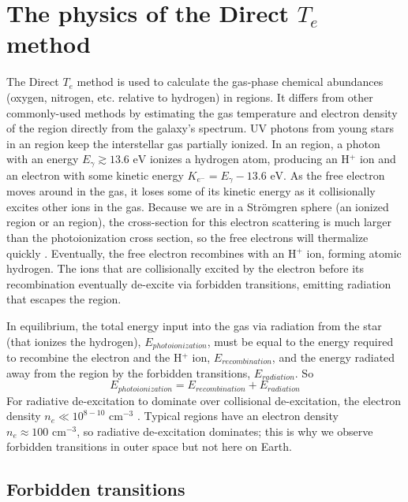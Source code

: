 \chapter[Direct method physics]{The physics of the Direct $T_e$ method}\label{sec:physics}

The Direct $T_e$ method is used to calculate the gas-phase chemical abundances 
(oxygen, nitrogen, etc. relative to hydrogen) in  regions.  It differs 
from other commonly-used methods by estimating the gas temperature and electron 
density of the region directly from the galaxy's spectrum.  UV photons from 
young stars in an  region keep the interstellar gas partially ionized.  
In an  region, a photon with an energy 
$E_\gamma \gtrsim 13.6\text{ eV}$ ionizes a hydrogen atom, producing an H$^+$ 
ion and an electron with some kinetic energy 
$K_{e^-} = E_\gamma - 13.6\text{ eV}$.  As the free electron moves around in the 
gas, it loses some of its kinetic energy as it collisionally excites other ions 
in the gas.  Because we are in a Str\"{o}mgren sphere (an ionized region or an 
 region), the cross-section for this electron scattering is much 
larger than the photoionization cross section, so the free electrons will 
thermalize quickly \citep{DeRobertis87}.  Eventually, the free electron 
recombines with an H$^+$ ion, forming atomic hydrogen.  The ions that are 
collisionally excited by the electron before its recombination eventually 
de-excite via forbidden transitions, emitting radiation that escapes the 
 region.

In equilibrium, the total energy input into the gas via radiation from the star 
(that ionizes the hydrogen), $E_{photoionization}$, must be equal to the energy 
required to recombine the electron and the H$^+$ ion, $E_{recombination}$, and 
the energy radiated away from the  region by the forbidden 
transitions, $E_{radiation}$.  So
\begin{equation}
    E_{photoionization} = E_{recombination} + E_{radiation}
\end{equation}
For radiative de-excitation to dominate over collisional de-excitation, the 
electron density $n_e \ll 10^{8-10}\text{ cm}^{-3}$ \citep{DeRobertis87}.  
Typical  regions have an electron density 
$n_e \approx 100\text{ cm}^{-3}$, so radiative de-excitation dominates; this is 
why we observe forbidden transitions in outer space but not here on Earth.


\section{Forbidden transitions}

